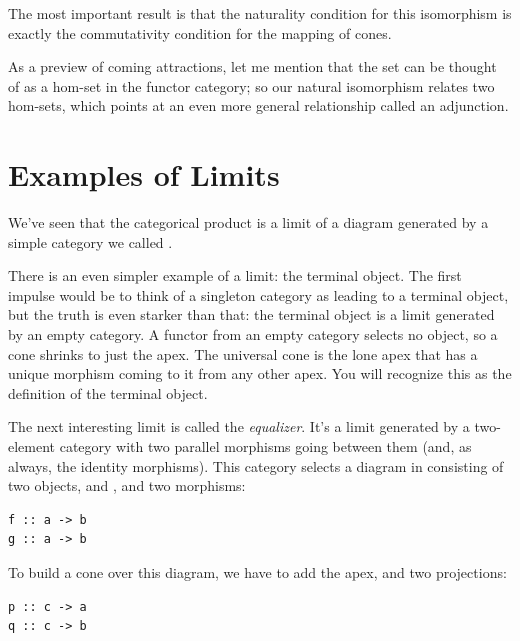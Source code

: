 The most important result is that the naturality condition for this
isomorphism is exactly the commutativity condition for the mapping of
cones.

As a preview of coming attractions, let me mention that the set
 can be thought of as a hom-set in the functor
category; so our natural isomorphism relates two hom-sets, which points
at an even more general relationship called an adjunction.

\section{Examples of Limits}\label{examples-of-limits}

We've seen that the categorical product is a limit of a diagram
generated by a simple category we called .

There is an even simpler example of a limit: the terminal object. The
first impulse would be to think of a singleton category as leading to a
terminal object, but the truth is even starker than that: the terminal
object is a limit generated by an empty category. A functor from an
empty category selects no object, so a cone shrinks to just the apex.
The universal cone is the lone apex that has a unique morphism coming to
it from any other apex. You will recognize this as the definition of the
terminal object.

The next interesting limit is called the \emph{equalizer}. It's a limit
generated by a two-element category with two parallel morphisms going
between them (and, as always, the identity morphisms). This category
selects a diagram in  consisting of two objects,  and
, and two morphisms:

\begin{Verbatim}[commandchars=\\\{\}]
f :: a -> b 
g :: a -> b
\end{Verbatim}
To build a cone over this diagram, we have to add the apex, 
and two projections:

\begin{Verbatim}[commandchars=\\\{\}]
p :: c -> a 
q :: c -> b
\end{Verbatim}

\begin{figure}[H]
\centering
{}
\end{figure}

